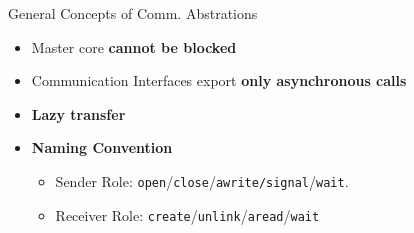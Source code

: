 		\begin{frame}[fragile]{General Concepts of Comm. Abstrations}
			\begin{itemize}
				\item Master core \textbf{cannot be blocked}
				\item Communication Interfaces export \textbf{only asynchronous calls}
				\item \textbf{Lazy transfer}
			\end{itemize}

			\begin{itemize}
				\item \textbf{Naming Convention}
				\begin{itemize}
					\item Sender Role: \texttt{open}/\texttt{close}/\texttt{awrite/signal}/\texttt{wait}.
					\item Receiver Role: \texttt{create}/\texttt{unlink}/\texttt{aread}/\texttt{wait}
				\end{itemize}
			\end{itemize}



		\end{frame}


